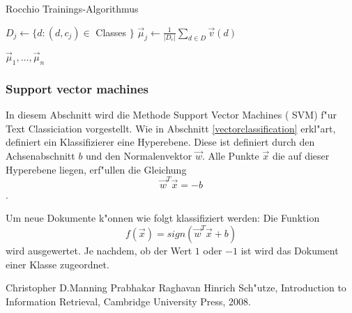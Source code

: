 \documentclass[12pt,a4paper,twoside]{article}
\begin{document}
\begin{algorithm}
\caption{Rocchio Trainings-Algorithmus}
\begin{algorithmic}

\State $ D_j \gets  \{d : (d,c_j) \in$ Classes $\}$
\State  $\vec \mu_j \gets \frac{1}{|D_c|} \sum_{d \in D} \vec v (d)$
\EndFor

\Return ${\vec \mu_1, \dots , \vec \mu_n }$    
 \end{algorithmic}  
\end{algorithm}

\subsubsection{Support vector machines}
\label{sec:svm}

In diesem Abschnitt wird die Methode Support Vector Machines ( SVM) f"ur Text Classiciation vorgestellt. Wie in Abschnitt \ref{vectorclassification} erkl"art, definiert ein Klassifizierer eine Hyperebene. Diese ist definiert durch den Achsenabschnitt $b$ und den Normalenvektor $ \vec w $. Alle Punkte $\vec x $ die auf dieser Hyperebene liegen, erf"ullen die Gleichung 
\[
\vec w^T \vec x = -b
\].

Um neue Dokumente k"onnen wie folgt klassifiziert werden: Die Funktion
\[
f(\vec x ) = sign( \vec w^T \vec x + b)
\]
wird ausgewertet. Je nachdem, ob der Wert $1$ oder $-1$ ist wird das Dokument einer Klasse zugeordnet.

\begin{thebibliography}{99}
Christopher D.Manning Prabhakar Raghavan Hinrich Sch"utze,
Introduction to Information Retrieval,
Cambridge University Press,
2008.
\end{thebibliography}
\end{document}
